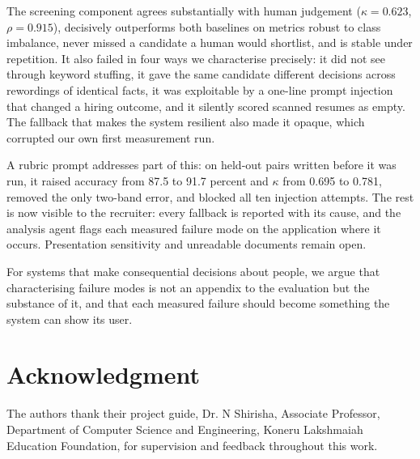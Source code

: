 \documentclass[conference]{IEEEtran}
\begin{document}
The screening component agrees substantially with human judgement
($\kappa = 0.623$, $\rho = 0.915$), decisively outperforms both baselines on
metrics robust to class imbalance, never missed a candidate a human would
shortlist, and is stable under repetition. It also failed in four ways we
characterise precisely: it did not see through keyword stuffing, it gave the
same candidate different decisions across rewordings of identical facts, it was
exploitable by a one-line prompt injection that changed a hiring outcome, and it
silently scored scanned resumes as empty. The fallback that makes the system
resilient also made it opaque, which corrupted our own first measurement run.

A rubric prompt addresses part of this: on held-out pairs written before it was
run, it raised accuracy from 87.5 to 91.7 percent and $\kappa$ from 0.695 to
0.781, removed the only two-band error, and blocked all ten injection attempts.
The rest is now visible to the recruiter: every fallback is reported with its
cause, and the analysis agent flags each measured failure mode on the
application where it occurs. Presentation sensitivity and unreadable documents
remain open.

For systems that make consequential decisions about people, we argue that
characterising failure modes is not an appendix to the evaluation but the
substance of it, and that each measured failure should become something the
system can show its user.

\section*{Acknowledgment}

The authors thank their project guide, Dr. N Shirisha, Associate Professor,
Department of Computer Science and Engineering, Koneru Lakshmaiah Education
Foundation, for supervision and feedback throughout this work.
\end{document}
